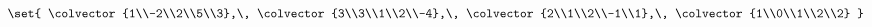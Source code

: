 $\set{
\colvector{1\\-2\\2\\5\\3},\,
\colvector{3\\3\\1\\2\\-4},\,
\colvector{2\\1\\2\\-1\\1},\,
\colvector{1\\0\\1\\2\\2}
}$